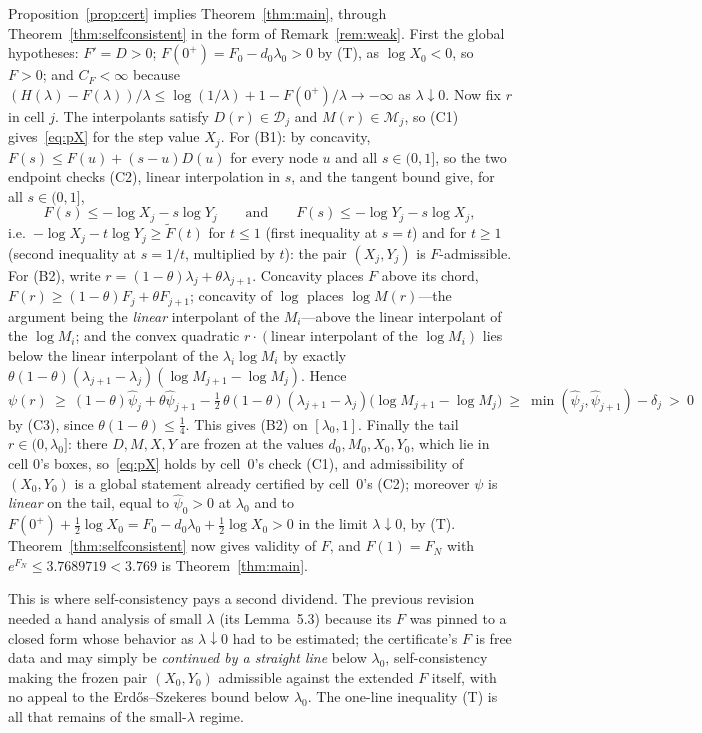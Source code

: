 \documentclass[11pt]{article}
\theoremstyle{definition}
\newcommand{\Ft}{\widetilde F}
\newcommand{\lam}{\lambda}
\begin{document}
Proposition~\ref{prop:cert} implies Theorem~\ref{thm:main}, through Theorem~\ref{thm:selfconsistent} in the form of Remark~\ref{rem:weak}.  First the global hypotheses: $F'=D>0$; $F(0^+)=F_0-d_0\lam_0>0$ by (T), as $\log X_0<0$, so $F>0$; and $C_F<\infty$ because $(H(\lam)-F(\lam))/\lam\le\log(1/\lam)+1-F(0^+)/\lam\to-\infty$ as $\lam\downarrow0$.  Now fix $r$ in cell $j$.  The interpolants satisfy $D(r)\in\mathcal D_j$ and $M(r)\in\mathcal M_j$, so (C1) gives~\eqref{eq:pX} for the step value $X_j$.  For (B1): by concavity, $F(s)\le F(u)+(s-u)D(u)$ for every node $u$ and all $s\in(0,1]$, so the two endpoint checks (C2), linear interpolation in $s$, and the tangent bound give, for all $s\in(0,1]$,
\[
F(s)\le-\log X_j-s\log Y_j\qquad\text{and}\qquad F(s)\le-\log Y_j-s\log X_j,
\]
i.e.\ $-\log X_j-t\log Y_j\ge\Ft(t)$ for $t\le1$ (first inequality at $s=t$) and for $t\ge1$ (second inequality at $s=1/t$, multiplied by $t$): the pair $(X_j,Y_j)$ is $F$-admissible.  For (B2), write $r=(1-\theta)\lam_j+\theta\lam_{j+1}$.  Concavity places $F$ above its chord, $F(r)\ge(1-\theta)F_j+\theta F_{j+1}$; concavity of $\log$ places $\log M(r)$---the argument being the \emph{linear} interpolant of the $M_i$---above the linear interpolant of the $\log M_i$; and the convex quadratic $r\cdot(\text{linear interpolant of the }\log M_i)$ lies below the linear interpolant of the $\lam_i\log M_i$ by exactly $\theta(1-\theta)(\lam_{j+1}-\lam_j)(\log M_{j+1}-\log M_j)$.  Hence
\[
\psi(r)\ \ge\ (1-\theta)\hat\psi_j+\theta\hat\psi_{j+1}-\tfrac12\,\theta(1-\theta)(\lam_{j+1}-\lam_j)\bigl(\log M_{j+1}-\log M_j\bigr)\ \ge\ \min(\hat\psi_j,\hat\psi_{j+1})-\delta_j\ >\ 0
\]
by (C3), since $\theta(1-\theta)\le\tfrac14$.  This gives (B2) on $[\lam_0,1]$.  Finally the tail $r\in(0,\lam_0]$: there $D,M,X,Y$ are frozen at the values $d_0,M_0,X_0,Y_0$, which lie in cell $0$'s boxes, so~\eqref{eq:pX} holds by cell~$0$'s check (C1), and admissibility of $(X_0,Y_0)$ is a global statement already certified by cell~$0$'s (C2); moreover $\psi$ is \emph{linear} on the tail, equal to $\hat\psi_0>0$ at $\lam_0$ and to $F(0^+)+\tfrac12\log X_0=F_0-d_0\lam_0+\tfrac12\log X_0>0$ in the limit $\lam\downarrow0$, by (T).  Theorem~\ref{thm:selfconsistent} now gives validity of $F$, and $F(1)=F_N$ with $e^{F_N}\le3.7689719<3.769$ is Theorem~\ref{thm:main}.

This is where self-consistency pays a second dividend.  The previous revision needed a hand analysis of small $\lam$ (its Lemma~5.3) because its $F$ was pinned to a closed form whose behavior as $\lam\downarrow0$ had to be estimated; the certificate's $F$ is free data and may simply be \emph{continued by a straight line} below $\lam_0$, self-consistency making the frozen pair $(X_0,Y_0)$ admissible against the extended $F$ itself, with no appeal to the Erd\H{o}s--Szekeres bound below $\lam_0$.  The one-line inequality (T) is all that remains of the small-$\lam$ regime.
\end{document}
